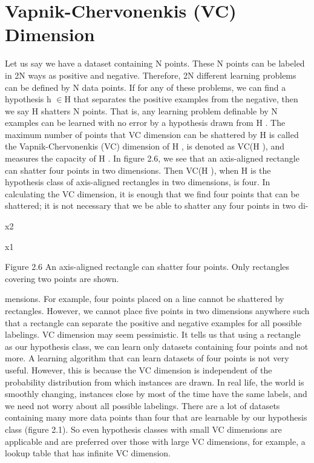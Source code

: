 \section{Vapnik-Chervonenkis (VC) Dimension}

Let us say we have a dataset containing N points. These N points can be labeled in 2N ways as positive and negative. Therefore, 2N different learning problems can be defined by N data points. If for any of these problems, we can find a hypothesis h $\in$H that separates the positive examples from the negative, then we say H shatters N points. That is, any learning problem definable by N examples can be learned with no error by a hypothesis drawn from H . The maximum number of points that VC dimension can be shattered by H is called the Vapnik-Chervonenkis (VC) dimension of H , is denoted as VC(H ), and measures the capacity of H . In figure 2.6, we see that an axis-aligned rectangle can shatter four points in two dimensions. Then VC(H ), when H is the hypothesis class of axis-aligned rectangles in two dimensions, is four. In calculating the VC dimension, it is enough that we find four points that can be shattered; it is not necessary that we be able to shatter any four points in two di-

x2

x1

Figure 2.6 An axis-aligned rectangle can shatter four points. Only rectangles covering two points are shown.

mensions. For example, four points placed on a line cannot be shattered by rectangles. However, we cannot place five points in two dimensions anywhere such that a rectangle can separate the positive and negative examples for all possible labelings. VC dimension may seem pessimistic. It tells us that using a rectangle as our hypothesis class, we can learn only datasets containing four points and not more. A learning algorithm that can learn datasets of four points is not very useful. However, this is because the VC dimension is independent of the probability distribution from which instances are drawn. In real life, the world is smoothly changing, instances close by most of the time have the same labels, and we need not worry about all possible labelings. There are a lot of datasets containing many more data points than four that are learnable by our hypothesis class (figure 2.1). So even hypothesis classes with small VC dimensions are applicable and are preferred over those with large VC dimensions, for example, a lookup table that has infinite VC dimension.


